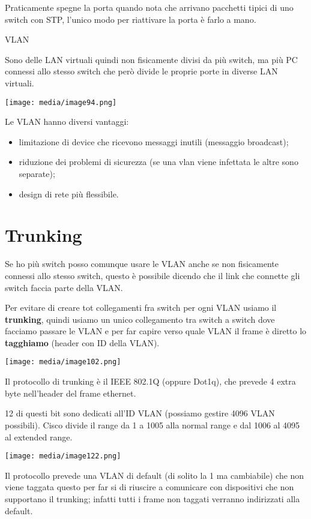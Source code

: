 Praticamente spegne la porta quando nota che arrivano pacchetti tipici
di uno switch con STP, l'unico modo per riattivare la porta è farlo a
mano.

VLAN

Sono delle LAN virtuali quindi non fisicamente divisi da più switch, ma
più PC connessi allo stesso switch che però divide le proprie porte in
diverse LAN virtuali.

\texttt{[image: media/image94.png]}

Le VLAN hanno diversi vantaggi:

\begin{itemize}
\item
  limitazione di device che ricevono messaggi inutili (messaggio
  broadcast);
\item
  riduzione dei problemi di sicurezza (se una vlan viene infettata le
  altre sono separate);
\item
  design di rete più flessibile.
\end{itemize}

\section{Trunking}\label{trunking}

Se ho più switch posso comunque usare le VLAN anche se non fisicamente
connessi allo stesso switch, questo è possibile dicendo che il link che
connette gli switch faccia parte della VLAN.

Per evitare di creare tot collegamenti fra switch per ogni VLAN usiamo
il \textbf{trunking}, quindi usiamo un unico collegamento tra switch a
switch dove facciamo passare le VLAN e per far capire verso quale VLAN
il frame è diretto lo \textbf{tagghiamo} (header con ID della VLAN).

\texttt{[image: media/image102.png]}

Il protocollo di trunking è il IEEE 802.1Q (oppure Dot1q), che prevede 4
extra byte nell'header del frame ethernet.

12 di questi bit sono dedicati all'ID VLAN (possiamo gestire 4096 VLAN
possibili). Cisco divide il range da 1 a 1005 alla normal range e dal
1006 al 4095 al extended range.

\texttt{[image: media/image122.png]}

Il protocollo prevede una VLAN di default (di solito la 1 ma cambiabile)
che non viene taggata questo per far si di riuscire a comunicare con
dispositivi che non supportano il trunking; infatti tutti i frame non
taggati verranno indirizzati alla default.

